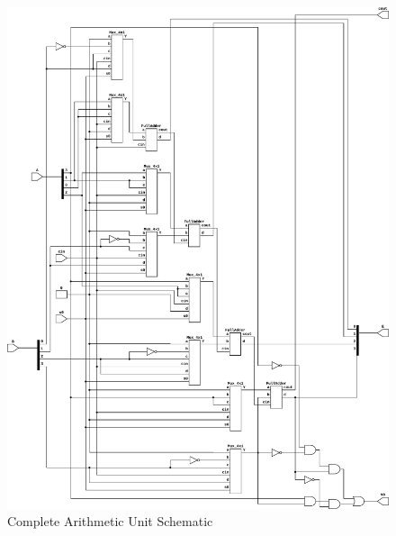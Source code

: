 \documentclass{article}
\begin{document}
\begin{figure}[p]
  \begin{center}
    \includegraphics[width=\textwidth]{figures/ArithmaticUnit.pdf}
  \end{center}
  \caption{Complete Arithmetic Unit Schematic}
\end{figure}
\end{document}
